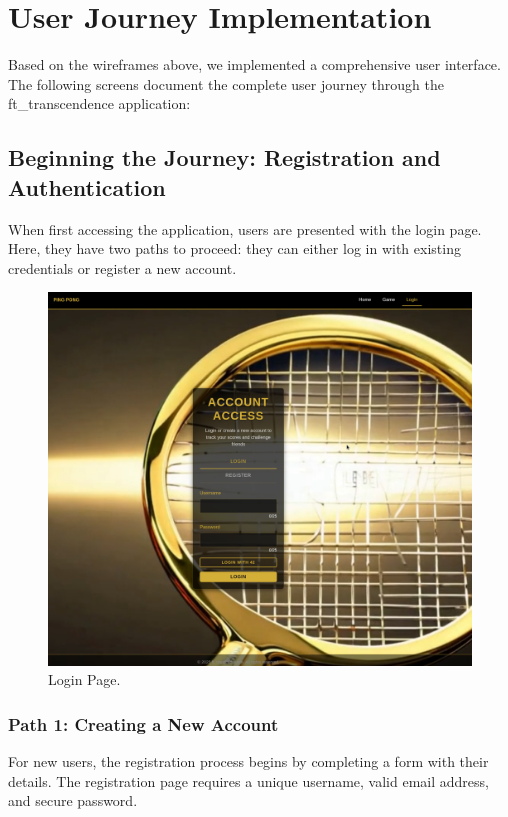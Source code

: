 \section{User Journey Implementation}

Based on the wireframes above, we implemented a comprehensive user interface. The following screens document the complete user journey through the ft\_transcendence application:

\subsection{Beginning the Journey: Registration and Authentication}

When first accessing the application, users are presented with the login page. Here, they have two paths to proceed: they can either log in with existing credentials or register a new account.

\begin{figure}[H]
    \centering
    \includegraphics[width=0.7\linewidth]{Figures/images/new_images/LoginPage.png}
    \caption{Login Page.} %
    \label{fig:login-page}
\end{figure}

\subsubsection{Path 1: Creating a New Account} For new users, the registration process begins by completing a form with their details. The registration page requires a unique username, valid email address, and secure password.

